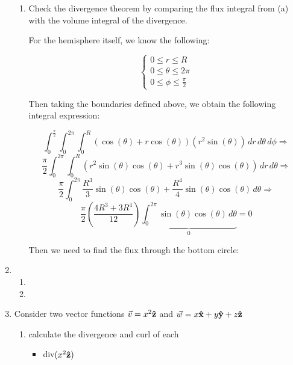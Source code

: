 \begin{enumerate}
\begin{enumerate}
      \item Check the divergence theorem by comparing the flux integral from (a) with the volume integral of the divergence.

        For the hemisphere itself, we know the following:

        $$\left\{\begin{array}{l} 0\leq r\leq R\\0\leq\theta\leq 2\pi\\0\leq\phi\leq \frac{\pi}{2}\end{array}$$

        Then taking the boundaries defined above, we obtain the following integral expression:

        $$\int_0^{\frac{\pi}{2}}\int_0^{2\pi}\int_0^R(\cos(\theta)+r\cos(\theta))(r^2\sin(\theta))\,dr\,d\theta\,d\phi\Rightarrow $$
        $$\frac{\pi}{2}\int_0^{2\pi}\int_0^R(r^2\sin(\theta)\cos(\theta)+r^3\sin(\theta)\cos(\theta))\,dr\,d\theta\Rightarrow$$
        $$\frac{\pi}{2}\int_0^{2\pi}\frac{R^3}{3}\sin(\theta)\cos(\theta)+\frac{R^4}{4}\sin(\theta)\cos(\theta)\,d\theta\Rightarrow$$
        $$\frac{\pi}{2}\left( \frac{4R^3+3R^4}{12} \right)\underbrace{\int_0^{2\pi}\sin(\theta)\cos(\theta)\,d\theta}_{\text{0}}=0$$

        Then we need to find the flux through the bottom circle:

    \end{enumerate}

  \item 

    \begin{enumerate}

      \item 

      \item 

    \end{enumerate}

  \item Consider two vector functions $\vec{v}=x^2\bold{\hat{z}}$ and $\vec{w}=x\bold{\hat{x}}+y\bold{\hat{y}}+z\bold{\hat{z}}$

    \begin{enumerate}

      \item calculate the divergence and curl of each

        \begin{itemize}

          \item div$(x^2\bold{\hat{z}})$


\end{itemize}
\end{enumerate}
\end{enumerate}
